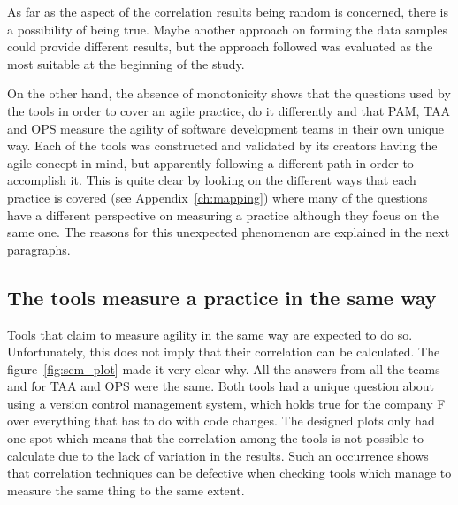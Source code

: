 As far as the aspect of the correlation results being random is concerned, there is a possibility of being true. Maybe another approach on forming the data samples could provide different results, but the approach followed was evaluated as the most suitable at the beginning of the study.

On the other hand, the absence of monotonicity shows that the questions used by the tools in order to cover an agile practice, do it differently and that \ac{PAM}, \ac{TAA} and \ac{OPS} measure the agility of software development teams in their own unique way. Each of the tools was constructed and validated by its creators having the agile concept in mind, but apparently following a different path in order to accomplish it. This is quite clear by looking on the different ways that each practice is covered (see Appendix~\ref{ch:mapping}) where many of the questions have a different perspective on measuring a practice although they focus on the same one. The reasons for this unexpected phenomenon are explained in the next paragraphs.

\subsection{The tools measure a practice in the same way}
Tools that claim to measure agility in the same way are expected to do so. Unfortunately, this does not imply that their correlation can be calculated. The figure~\ref{fig:scm_plot} made it very clear why. All the answers from all the teams and for \ac{TAA} and \ac{OPS} were the same. Both tools had a unique question about using a version control management system, which holds true for the company F over everything that has to do with code changes. The designed plots only had one spot which means that the correlation among the tools is not possible to calculate due to the lack of variation in the results. Such an occurrence shows that correlation techniques can be defective when checking tools which manage to measure the same thing to the same extent.

